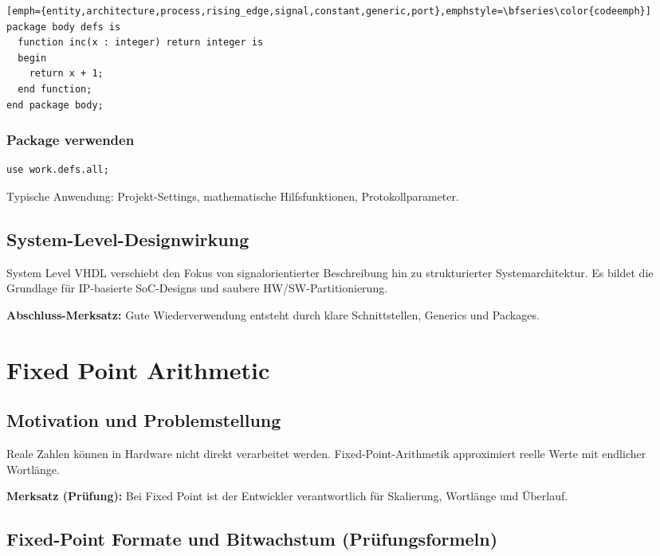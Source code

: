 \documentclass[10pt,a4paper]{article}
\newcommand{\hilite}[1]{\colorbox{yellow!25}{#1}}
\newcommand{\imp}[1]{\textbf{\textcolor{codeemph}{#1}}}
\begin{document}
\begin{multicols}{3}
\begin{lstlisting}[emph={entity,architecture,process,rising_edge,signal,constant,generic,port},emphstyle=\bfseries\color{codeemph}][emph={entity,architecture,process,rising_edge,signal,constant,generic,port},emphstyle=\bfseries\color{codeemph}]
package body defs is
  function inc(x : integer) return integer is
  begin
    return x + 1;
  end function;
end package body;
\end{lstlisting}

\subsubsection*{Package verwenden}
\begin{lstlisting}[emph={entity,architecture,process,rising_edge,signal,constant,generic,port},emphstyle=\bfseries\color{codeemph}]
use work.defs.all;
\end{lstlisting}

Typische Anwendung: Projekt-Settings, mathematische Hilfsfunktionen, Protokollparameter.

\subsection{System-Level-Designwirkung}
System Level VHDL verschiebt den Fokus von signalorientierter Beschreibung hin zu strukturierter Systemarchitektur. Es bildet die Grundlage für IP-basierte SoC-Designs und saubere HW/SW-Partitionierung.

\imp{Abschluss-Merksatz:}  
Gute \hilite{Wiederverwendung} entsteht durch klare Schnittstellen, Generics und \hilite{Packages}.

\section{\hilite{Fixed Point} Arithmetic}

\subsection{Motivation und Problemstellung}
Reale Zahlen können in Hardware nicht direkt verarbeitet werden.  
\hilite{Fixed-Point-Arithmetik} approximiert reelle Werte mit endlicher Wortlänge.

\imp{Merksatz (Prüfung):}  
Bei \hilite{Fixed Point} ist der Entwickler verantwortlich für \hilite{Skalierung}, \hilite{Wortlänge} und \hilite{Überlauf}.


\subsection{Fixed-Point Formate und Bitwachstum (Prüfungsformeln)}


\end{multicols}
\end{document}
